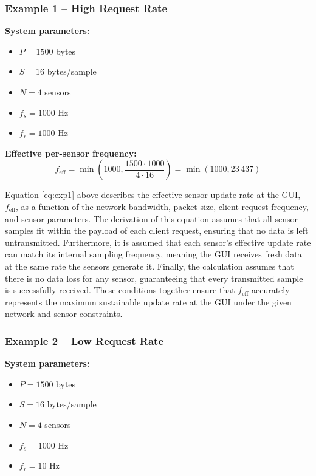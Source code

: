 \subsubsection{Example 1 – High Request Rate}

\textbf{System parameters:}
\begin{itemize}
    \item[] $P = 1500$ bytes
    \item[] $S = 16$ bytes/sample
    \item[] $N = 4$ sensors
    \item[] $f_s = 1000$ Hz
    \item[] $f_r = 1000$ Hz
\end{itemize}

\textbf{Effective per-sensor frequency:}
\begin{equation}
f_{\text{eff}} = \min \left( 1000, \frac{1500 \cdot 1000}{4 \cdot 16} \right) = \min(1000, 23\,437)
\label{eq:exp1}
\end{equation}


Equation \ref{eq:exp1} above describes the effective sensor update rate at the GUI, 
$f_\text{eff}$, as a function of the network bandwidth, packet size, client request 
frequency, and sensor parameters. The derivation of this equation assumes that all 
sensor samples fit within the payload of each client request, ensuring that no data is 
left untransmitted. Furthermore, it is assumed that each sensor's effective update 
rate can match its internal sampling frequency, meaning the GUI receives fresh data
at the same rate the sensors generate it. Finally, the calculation assumes that there 
is no data loss for any sensor, guaranteeing that every transmitted sample is 
successfully received. These conditions together ensure that 
$f_\text{eff}$ accurately represents the maximum sustainable update rate at the GUI under the 
given network and sensor constraints.

\subsubsection{Example 2 – Low Request Rate}

\textbf{System parameters:}
\begin{itemize}
    \item[] $P = 1500$ bytes
    \item[] $S = 16$ bytes/sample
    \item[] $N = 4$ sensors
    \item[] $f_s = 1000$ Hz
    \item[] $f_r = 10$ Hz
\end{itemize}

